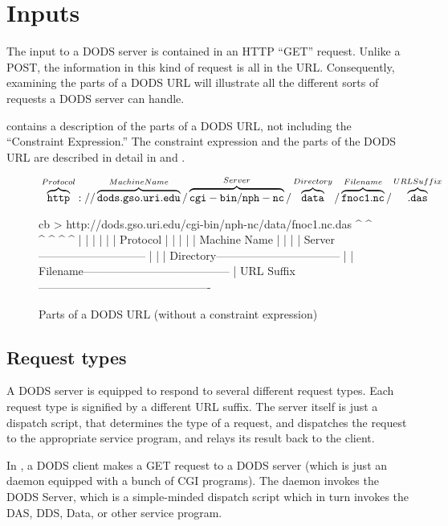 \section{Inputs}
\label{pguide,server,input}

The input to a DODS server is contained in an HTTP ``GET'' request.
Unlike a POST, the information in this kind of request is all in the
URL.  Consequently, examining the parts of a DODS URL will illustrate
all the different sorts of requests a DODS server can handle.

 contains a description of the parts
of a DODS URL, not including the ``Constraint Expression.''  The
constraint expression and the parts of the DODS URL are described in
detail in \OPDuser[constraint] and .

\begin{figure}[h]
\texorhtml
{\small
${}\overbrace{\tt http}^{Protocol}://
\overbrace{\tt dods.gso.uri.edu}^{Machine Name}/
\overbrace{\tt cgi-bin/nph-nc}^{Server}/
\overbrace{\tt data}^{Directory}/
\overbrace{\tt fnoc1.nc}^{Filename}/
\overbrace{\tt .das}^{URL Suffix}$}
{\begin{vcode}{cb}
> http://dods.gso.uri.edu/cgi-bin/nph-nc/data/fnoc1.nc.das
   ^     ^                        ^      ^    ^        ^
   |     |                        |      |    |        |
Protocol |                        |      |    |        |
Machine Name                      |      |    |        |
Server-----------------------------      |    |        |
Directory---------------------------------    |        |
Filename---------------------------------------        |
URL Suffix----------------------------------------------
\end{vcode}}
\caption{Parts of a DODS URL (without a constraint expression)}
\label{dods-api,fig,url-parts}
\end{figure}

\subsection{Request types}

A DODS server is equipped to respond to several different request
types.  Each request type is signified by a different URL suffix.  The
server itself is just a dispatch script, that determines the type of a
request, and dispatches the request to the appropriate service
program, and relays its result back to the client.

In , a DODS client makes a GET request
to a DODS server (which is just an  daemon equipped with a
bunch of CGI programs).  The daemon invokes the DODS Server, which is
a simple-minded dispatch script which in turn invokes the DAS, DDS,
Data, or other service program.

